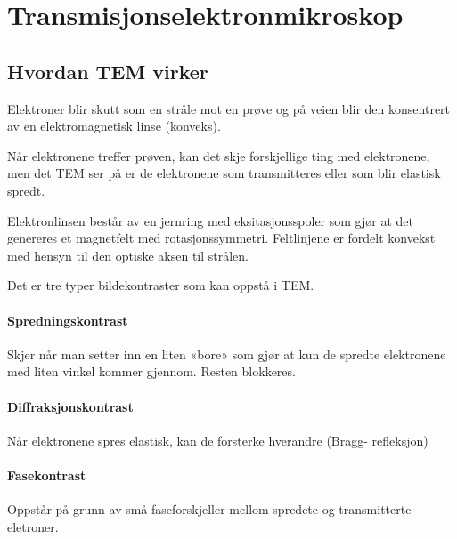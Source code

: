 \documentclass[norsk, 12pt]{article}
\title{}
\begin{document}
\section{Transmisjonselektronmikroskop}
\label{sec:1}
\subsection{Hvordan TEM virker}
\label{sub:1.1}
Elektroner blir skutt som en stråle mot en 
prøve og på veien blir den konsentrert
av en elektromagnetisk linse (konveks).

Når elektronene treffer prøven,
kan det skje forskjellige ting
med elektronene,
men det TEM ser på er de elektronene
som transmitteres eller som
blir elastisk spredt.

Elektronlinsen består av en
jernring med eksitasjonsspoler
som gjør at det genereres et
magnetfelt med rotasjonssymmetri.
Feltlinjene er fordelt konvekst
med hensyn til den optiske
aksen til strålen.

Det er tre typer bildekontraster
som kan oppstå i TEM.

\paragraph{Spredningskontrast}
\label{par:1.1.1}
Skjer når man setter inn
en liten «bore» som gjør at kun
de spredte elektronene med liten vinkel
kommer gjennom. Resten blokkeres.
\paragraph{Diffraksjonskontrast}
\label{par:1.1.2}
Når elektronene spres elastisk,
kan de forsterke hverandre (Bragg-
refleksjon)
\paragraph{Fasekontrast}
\label{par:1.1.3}
Oppstår på grunn av små faseforskjeller
mellom spredete og transmitterte
eletroner.
\end{document}
